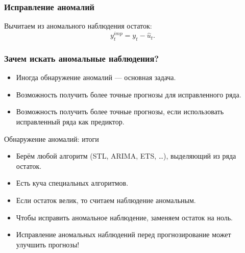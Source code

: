 \begin{frame}
  \frametitle{Исправление аномалий}

  \pause
  Вычитаем из аномального наблюдения остаток:
  \[
  y_t^{imp} = y_t  - \hat u_t.  
  \]

\end{frame}



\begin{frame}
  \frametitle{Зачем искать аномальные наблюдения?}

  \begin{itemize}[<+->]
    \item Иногда обнаружение аномалий — \alert{основная задача}. 
    \item Возможность получить \alert{более точные} прогнозы для исправленного ряда.
    \item Возможность получить \alert{более точные} прогнозы, если использовать исправленный ряда как предиктор.
  \end{itemize}
  

\end{frame}



\begin{frame}{Обнаружение аномалий: итоги}

  \begin{itemize}[<+->]
    \item Берём любой алгоритм (STL, ARIMA, ETS, \ldots), выделяющий из ряда \alert{остаток}.
    \item Есть \alert{куча} специальных алгоритмов.
    \item Если остаток \alert{велик}, то считаем наблюдение аномальным. 
    \item Чтобы исправить аномальное наблюдение, заменяем остаток \alert{на ноль}.
    \item \alert{Исправление} аномальных наблюдений перед прогнозирование может улучшить прогнозы!
  \end{itemize}
\end{frame}

